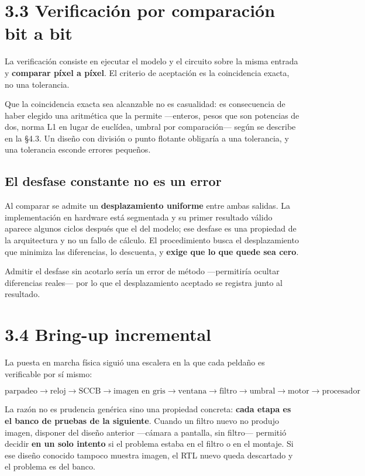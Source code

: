 \section{3.3 Verificación por comparación bit a
bit}\label{verificaciuxf3n-por-comparaciuxf3n-bit-a-bit}

La verificación consiste en ejecutar el modelo y el circuito sobre la
misma entrada y \textbf{comparar píxel a píxel}. El criterio de
aceptación es la coincidencia exacta, no una tolerancia.

Que la coincidencia exacta sea alcanzable no es casualidad: es
consecuencia de haber elegido una aritmética que la permite ---enteros,
pesos que son potencias de dos, norma L1 en lugar de euclídea, umbral
por comparación--- según se describe en la §4.3. Un diseño con división
o punto flotante obligaría a una tolerancia, y una tolerancia esconde
errores pequeños.

\subsection{El desfase constante no es un
error}\label{el-desfase-constante-no-es-un-error}

Al comparar se admite un \textbf{desplazamiento uniforme} entre ambas
salidas. La implementación en hardware está segmentada y su primer
resultado válido aparece algunos ciclos después que el del modelo; ese
desfase es una propiedad de la arquitectura y no un fallo de cálculo. El
procedimiento busca el desplazamiento que minimiza las diferencias, lo
descuenta, y \textbf{exige que lo que quede sea cero}.

Admitir el desfase sin acotarlo sería un error de método ---permitiría
ocultar diferencias reales--- por lo que el desplazamiento aceptado se
registra junto al resultado.

\section{3.4 Bring-up incremental}\label{bring-up-incremental}

La puesta en marcha física siguió una escalera en la que cada peldaño es
verificable por sí mismo:

\[\text{parpadeo} \rightarrow \text{reloj} \rightarrow \text{SCCB} \rightarrow \text{imagen en gris} \rightarrow \text{ventana} \rightarrow \text{filtro} \rightarrow \text{umbral} \rightarrow \text{motor} \rightarrow \text{procesador}\]

La razón no es prudencia genérica sino una propiedad concreta:
\textbf{cada etapa es el banco de pruebas de la siguiente}. Cuando un
filtro nuevo no produjo imagen, disponer del diseño anterior ---cámara a
pantalla, sin filtro--- permitió decidir \textbf{en un solo intento} si
el problema estaba en el filtro o en el montaje. Si ese diseño conocido
tampoco muestra imagen, el RTL nuevo queda descartado y el problema es
del banco.

